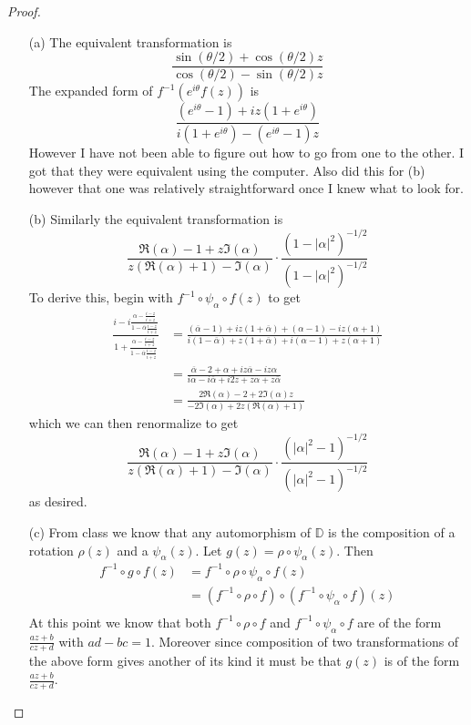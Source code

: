 \documentclass[10pt]{article}
\newcommand{\bb}[1]{\mathbb{#1}}
\newcommand{\conj}[1]{\overline{#1}}
\theoremstyle{remark}
\theoremstyle{remark}
\begin{document}
\begin{proof}
  \begin{enumerate}
  \item[(a)] The equivalent transformation is
    \[
      \frac{\sin(\theta/2)+\cos(\theta/2)z}{\cos(\theta/2)-\sin(\theta/2)z}
    \]
    The expanded form of $f^{-1}(e^{i\theta}f(z))$ is
    \[
      \frac{(e^{i\theta}-1)+iz(1+e^{i\theta})}{i(1+e^{i\theta})-(e^{i\theta}-1)z}
    \]
    However I have not been able to figure out how to go from
    one to the other. I got that they were equivalent using the
    computer. Also did this for (b) however that one was relatively
    straightforward once I knew what to look for.
  \item[(b)] Similarly the equivalent transformation is
    \[
      \frac{\Re(\alpha)-1+z\Im(\alpha)}{z(\Re(\alpha)+1)-\Im(\alpha)}\cdot\frac{(1-|\alpha|^2)^{-1/2}}{(1-|\alpha|^2)^{-1/2}}
    \]
    To derive this, begin with $f^{-1}\circ\psi_\alpha\circ f(z)$ to get
    \begin{align*}
      \frac{i-i\frac{\alpha-\frac{i-z}{i+z}}{1-\conj{\alpha}\frac{i-z}{i+z}}}{1+\frac{\alpha-\frac{i-z}{i+z}}{1-\conj{\alpha}\frac{i-z}{i+z}}}&=\frac{(\conj{\alpha}-1)+iz(1+\conj{\alpha})+(\alpha-1)-iz(\alpha+1)}{i(1-\conj{\alpha})+z(1+\conj{\alpha})+i(\alpha-1)+z(\alpha+1)}\\
                                                                                                                          &=\frac{\conj{\alpha}-2+\alpha+iz\conj{\alpha}-iz\alpha}{i\alpha-i\conj{\alpha}+i2z+z\alpha+z\conj{\alpha}}\\
                                                                                                                          &=\frac{2\Re(\alpha)-2+2\Im(\alpha)z}{-2\Im(\alpha)+2z(\Re(\alpha)+1)}
    \end{align*}
    which we can then renormalize to get
    \[
      \frac{\Re(\alpha)-1+z\Im(\alpha)}{z(\Re(\alpha)+1)-\Im(\alpha)}\cdot\frac{(|\alpha|^2-1)^{-1/2}}{(|\alpha|^2-1)^{-1/2}}
    \]
    as desired.
  \item[(c)] From class we know that any automorphism of $\bb{D}$ is the
    composition of a rotation $\rho(z)$ and a $\psi_\alpha(z)$. Let $g(z)=\rho\circ\psi_\alpha(z)$.
    Then
    \begin{align*}
      f^{-1}\circ g\circ f(z) &= f^{-1}\circ\rho\circ\psi_\alpha \circ f(z)\\
                      &= (f^{-1}\circ\rho\circ f)\circ (f^{-1}\circ\psi_\alpha \circ f)(z)\\
    \end{align*}
    At this point we know that both $f^{-1}\circ\rho\circ f$ and $f^{-1}\circ\psi_\alpha \circ f$
    are of the form $\frac{az+b}{cz+d}$ with $ad-bc=1$. Moreover since
    composition of two transformations of the above form gives another of
    its kind it must be that $g(z)$ is of the form $\frac{az+b}{cz+d}$.
  \end{enumerate}
\end{proof}
\end{document}
